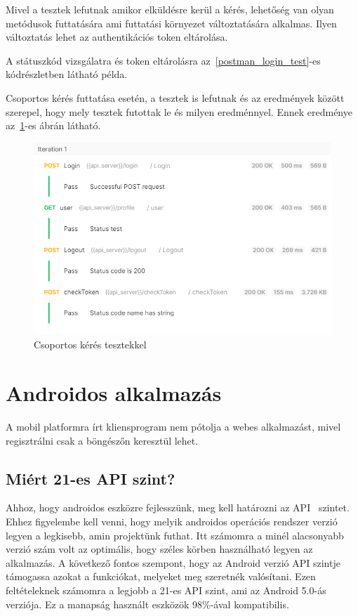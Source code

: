 \documentclass[
]{thesis-ekf}
\theoremstyle{definition}
\theoremstyle{remark}
\begin{document}
	Mivel a tesztek lefutnak amikor elküldésre kerül a kérés, lehetőség van olyan metódusok futtatására ami futtatási környezet változtatására alkalmas. Ilyen változtatás lehet az authentikációs token eltárolása.
	
	A státuszkód vizsgálatra és token eltárolásra az~\ref{postman_login_test}-es kódrészletben látható példa.
	
	Csoportos kérés futtatása esetén, a tesztek is lefutnak és az eredmények között szerepel, hogy mely tesztek futottak le és milyen eredménnyel. Ennek eredménye az~\ref{figure:collection_query}-es ábrán látható.
	
	\begin{figure}[ht!]
		\centering
		\includegraphics[width=1\textwidth]{postman/collection_query}
		\caption{Csoportos kérés tesztekkel}
		\label{figure:collection_query}
	\end{figure}
	
	\newpage
	 
	
	\chapter{Androidos alkalmazás}
	A mobil platformra írt kliensprogram nem pótolja a webes alkalmazást, mivel regisztrálni csak a böngészőn keresztül lehet. 
	\section{Miért 21-es API szint?}
	Ahhoz, hogy androidos eszközre fejlesszünk, meg kell határozni az API~\cite{android_api_level} szintet. Ehhez figyelembe kell venni, hogy melyik androidos operációs rendszer verzió legyen a legkisebb, amin projektünk futhat. Itt számomra a minél alacsonyabb verzió szám volt az optimális, hogy széles körben használható legyen az alkalmazás. A következő fontos szempont, hogy az Android verzió API szintje támogassa azokat a funkciókat, melyeket meg szeretnék valósítani. Ezen feltételeknek számomra a legjobb a 21-es API szint, ami az Android 5.0-ás verziója. Ez a manapság használt eszközök 98\%-ával kompatibilis.
	
\end{document}
